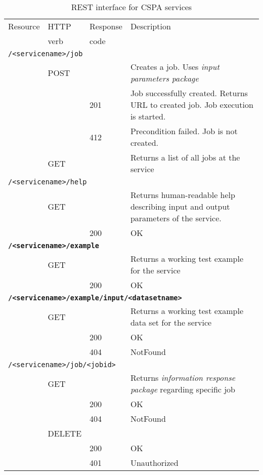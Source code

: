 \documentclass[a4paper]{article}
\begin{document}
\begin{table}
  \caption{REST interface for CSPA services}
  \label{tab:interf}
  \begin{tabular}{l l l p{}}
    \toprule
    Resource & HTTP & Response & Description \\
             & verb & code     &  \\

    \midrule
    \multicolumn{4}{l}{\texttt{/<servicename>/job}} \\
    & POST &  & Creates a job. Uses \emph{input parameters package} \\
    &   & 201 & Job successfully created. Returns URL to created job. Job execution is started. \\
    &   & 412 & Precondition failed. Job is not created.\\
    & GET  &  & Returns a list of all jobs at the service \\

    \multicolumn{4}{l}{\texttt{/<servicename>/help}} \\
    & GET &   & Returns human-readable help describing input and output parameters of the service. \\
    &   & 200  & OK \\

    \multicolumn{4}{l}{\bf\texttt{/<servicename>/example}} \\
    & GET &   & Returns a working test example for the service \\
    &   & 200  & OK \\

    \multicolumn{4}{l}{\bf\texttt{/<servicename>/example/input/<datasetname>}} \\
    & GET &   & Returns a working test example data set for the service \\
    &   & 200  & OK \\
    &   & 404  & NotFound \\

    \multicolumn{4}{l}{\texttt{/<servicename>/job/<jobid>}} \\
    & GET &    & Returns \emph{information response package} regarding specific job \\
    &   & 200  & OK \\
    &   & 404  & NotFound \\
    & DELETE & &  \\
    &   & 200  & OK \\
    &   & 401  & Unauthorized \\


\end{tabular}
\end{table}
\end{document}
